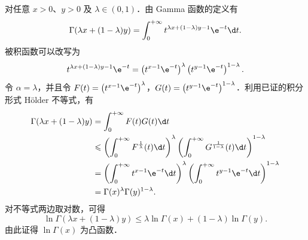 \begin{myproof}
    对任意 $x > 0$、$y > 0$ 及 $\lambda \in (0, 1)$．由 Gamma 函数的定义有
    \begin{equation}\label{eq:sol4-gamma-val}
        \Gamma(\lambda x + (1-\lambda)y) = \int_0^{+\infty} t^{\lambda x + (1-\lambda)y - 1} \e^{-t} \d t.
    \end{equation}
    被积函数可以改写为
    \begin{equation}\label{eq:sol4-gamma-split}
        t^{\lambda x + (1-\lambda)y - 1} \e^{-t} = \left( t^{x-1} \e^{-t} \right)^{\lambda} \left( t^{y-1} \e^{-t} \right)^{1-\lambda}.
    \end{equation}
    令 $\alpha = \lambda$，并且令 $F(t) = \left( t^{x-1} \e^{-t} \right)^{\lambda}$，$G(t) = \left( t^{y-1} \e^{-t} \right)^{1-\lambda}$．利用已证的积分形式 Hölder 不等式，有
    \begin{equation}\label{eq:sol4-holder-app}
        \begin{aligned}
            \Gamma(\lambda x + (1-\lambda)y) & = \int_0^{+\infty} F(t) G(t) \d t                                                                                                                             \\
                                             & \leqslant \left( \int_0^{+\infty} F^{\frac{1}{\lambda}}(t) \d t \right)^{\lambda} \left( \int_0^{+\infty} G^{\frac{1}{1-\lambda}}(t) \d t \right)^{1-\lambda} \\
                                             & = \left( \int_0^{+\infty} t^{x-1} \e^{-t} \d t \right)^{\lambda} \left( \int_0^{+\infty} t^{y-1} \e^{-t} \d t \right)^{1-\lambda}                             \\
                                             & = \Gamma(x)^{\lambda} \Gamma(y)^{1-\lambda}.
        \end{aligned}
    \end{equation}
    对不等式两边取对数，可得
    \begin{equation}\label{eq:sol4-log-convex}
        \ln \Gamma(\lambda x + (1-\lambda)y) \leqslant \lambda \ln \Gamma(x) + (1-\lambda) \ln \Gamma(y).
    \end{equation}
    由此证得 $\ln \Gamma(x)$ 为凸函数．
\end{myproof}

\endinput
